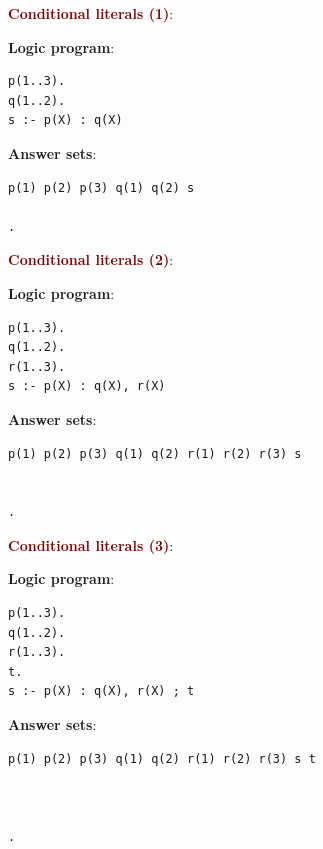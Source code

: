 {\Large \textbf{\textcolor{Maroon}{Conditional literals (1)}}}: \\
\begin{minipage}{0.6\textwidth}
\textbf{Logic program}:
\begin{lstlisting}
p(1..3).
q(1..2).
s :- p(X) : q(X)
\end{lstlisting}
\end{minipage}
\begin{minipage}{0.3\textwidth}
\textbf{Answer sets}:
\begin{lstlisting}
p(1) p(2) p(3) q(1) q(2) s

.
\end{lstlisting}
\end{minipage}

\newpage

{\Large \textbf{\textcolor{Maroon}{Conditional literals (2)}}}: \\
\begin{minipage}{0.4\textwidth}
\textbf{Logic program}:
\begin{lstlisting}
p(1..3).
q(1..2).
r(1..3).
s :- p(X) : q(X), r(X)
\end{lstlisting}
\end{minipage}
\begin{minipage}{0.6\textwidth}
\textbf{Answer sets}:
\begin{lstlisting}
p(1) p(2) p(3) q(1) q(2) r(1) r(2) r(3) s


.
\end{lstlisting}
\end{minipage}

\vspace{0.35cm}

{\Large \textbf{\textcolor{Maroon}{Conditional literals (3)}}}: \\
\begin{minipage}{0.4\textwidth}
\textbf{Logic program}:
\begin{lstlisting}
p(1..3).
q(1..2).
r(1..3).
t.
s :- p(X) : q(X), r(X) ; t
\end{lstlisting}
\end{minipage}
\begin{minipage}{0.6\textwidth}
\textbf{Answer sets}:
\begin{lstlisting}
p(1) p(2) p(3) q(1) q(2) r(1) r(2) r(3) s t



.
\end{lstlisting}
\end{minipage}

